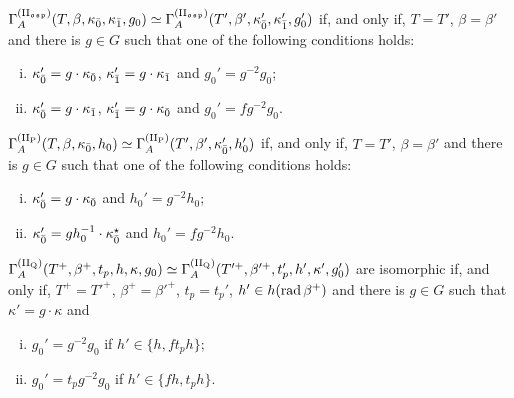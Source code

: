 \begin{thm}
    \noindent{}
    
        \noindent$\Gamma^{\mathrm{(II_{\mathfrak{osp}})}}_A (T, \beta, \kappa_{\bar{0}}, \kappa_{\bar{1}}, g_0) 
        \simeq \Gamma^{\mathrm{(II_{\mathfrak{osp}})}}_A (T', \beta', \kappa_{\bar{0}}', \kappa_{\bar{1}}', g_0')$ if, and only if, $T =T'$, $\beta = \beta'$ and there is $g \in G$ such that one of the following conditions holds:
    \begin{enumerate}[(i)]
        \item $\kappa_{\bar{0}}' = g\cdot\kappa_{\bar{0}}$, $\kappa_{\bar{1}}' = g\cdot\kappa_{\bar{1}}$ and $g_0' = g^{-2}g_0$;
        \item $\kappa_{\bar{0}}' = g\cdot\kappa_{\bar{1}}$, $\kappa_{\bar{1}}' = g\cdot\kappa_{\bar{0}}$ and $g_0' = fg^{-2}g_0$. 
    \end{enumerate}
        
    \noindent{}
    
        \noindent$\Gamma_A^{\mathrm{(II_P)}} 
        (T, \beta, \kappa_{\bar{0}}, h_0)
        \simeq 
        \Gamma_A^{\mathrm{(II_P)}} (T', \beta', \kappa_{\bar{0}}', h_0')$ if, and only if, $T =T'$, $\beta = \beta'$ and there is $g \in G$ such that one of the following conditions holds:
    \begin{enumerate}[(i)]
        \item $\kappa_{\bar{0}}' = g\cdot\kappa_{\bar{0}}$ and $h_0' = g^{-2}h_0$;
        \item $\kappa_{\bar{0}}' = gh_0^{-1} \cdot\kappa_{\bar{0}}^\star$ and $h_0' = fg^{-2}h_0$. 
    \end{enumerate}
        
    \noindent{}
    
        \noindent$\Gamma_A^{\mathrm{(II_Q)}} (T^+, \beta^+, t_p, h, \kappa, g_0) 
            \simeq 
        \Gamma_A^{\mathrm{(II_Q)}} (T'^+, \beta'^+, t_p',  h', \kappa', g_0')$ are isomorphic if, and only if, $T^+ =T'^+$, $\beta^+ = \beta'^+$, $t_p = t_p'$, $h' \in h (\operatorname{rad} \beta^+)$ and there is $g \in G$ such that $\kappa' = g\cdot\kappa$ and
    \begin{enumerate}[(i)]
        \item $g_0' = g^{-2}g_0$ if $h' \in \{ h, f t_p h\}$;
        \item $g_0' = t_p g^{-2}g_0$ if $h' \in \{ f h, t_p h\}$.
    \end{enumerate}
\end{thm}

